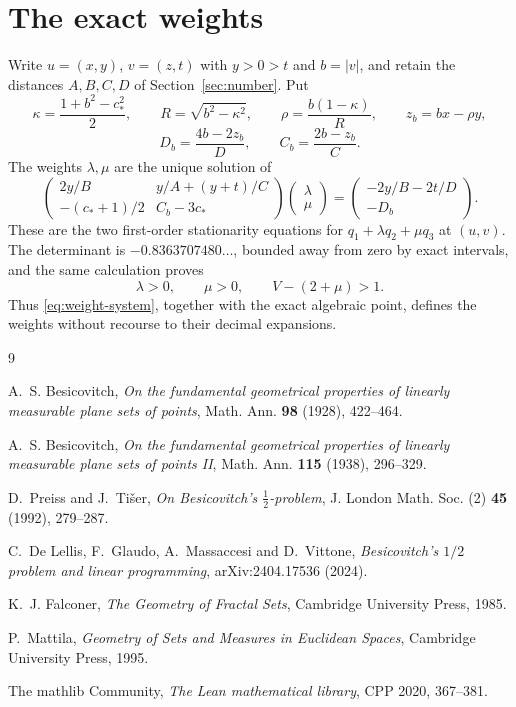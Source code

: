 \documentclass[11pt]{article}
\theoremstyle{plain}
\theoremstyle{definition}
\theoremstyle{remark}
\newcommand{\cstar}{c_{\!*}}
\begin{document}
\section{The exact weights}\label{app:weights}

Write $u=(x,y)$, $v=(z,t)$ with $y>0>t$ and $b=|v|$, and retain the
distances $A,B,C,D$ of Section~\ref{sec:number}.  Put
\[
 \kappa=\frac{1+b^2-\cstar^2}{2},\qquad R=\sqrt{b^2-\kappa^2},\qquad
 \rho=\frac{b(1-\kappa)}{R},\qquad z_b=bx-\rho y,
\]
\[
 D_b=\frac{4b-2z_b}{D},\qquad C_b=\frac{2b-z_b}{C}.
\]
The weights $\lambda,\mu$ are the unique solution of
\begin{equation}\label{eq:weight-system}
 \begin{pmatrix}
  2y/B & y/A+(y+t)/C\\[0.2em]
  -(\cstar+1)/2 & C_b-3\cstar
 \end{pmatrix}
 \begin{pmatrix}\lambda\\ \mu\end{pmatrix}
 =\begin{pmatrix}-2y/B-2t/D\\ -D_b\end{pmatrix}.
\end{equation}
These are the two first-order stationarity equations for
$q_1+\lambda q_2+\mu q_3$ at $(u,v)$.  The determinant is
$-0.8363707480\ldots$, bounded away from zero by exact intervals, and the
same calculation proves
\[
 \lambda>0,\qquad \mu>0,\qquad V-(2+\mu)>1 .
\]
Thus \eqref{eq:weight-system}, together with the exact algebraic point,
defines the weights without recourse to their decimal expansions.

\begin{thebibliography}{9}

 A.~S. Besicovitch,
\emph{On the fundamental geometrical properties of linearly measurable
plane sets of points}, Math. Ann. \textbf{98} (1928), 422--464.

 A.~S. Besicovitch,
\emph{On the fundamental geometrical properties of linearly measurable
plane sets of points II}, Math. Ann. \textbf{115} (1938), 296--329.

 D.~Preiss and J.~Ti\v{s}er,
\emph{On Besicovitch's $\tfrac12$-problem},
J. London Math. Soc. (2) \textbf{45} (1992), 279--287.

 C.~De Lellis, F.~Glaudo, A.~Massaccesi and D.~Vittone,
\emph{Besicovitch's $1/2$ problem and linear programming},
arXiv:2404.17536 (2024).

 K.~J. Falconer,
\emph{The Geometry of Fractal Sets}, Cambridge University Press, 1985.

 P.~Mattila,
\emph{Geometry of Sets and Measures in Euclidean Spaces},
Cambridge University Press, 1995.

 The mathlib Community,
\emph{The Lean mathematical library}, CPP 2020, 367--381.

\end{thebibliography}
\end{document}
